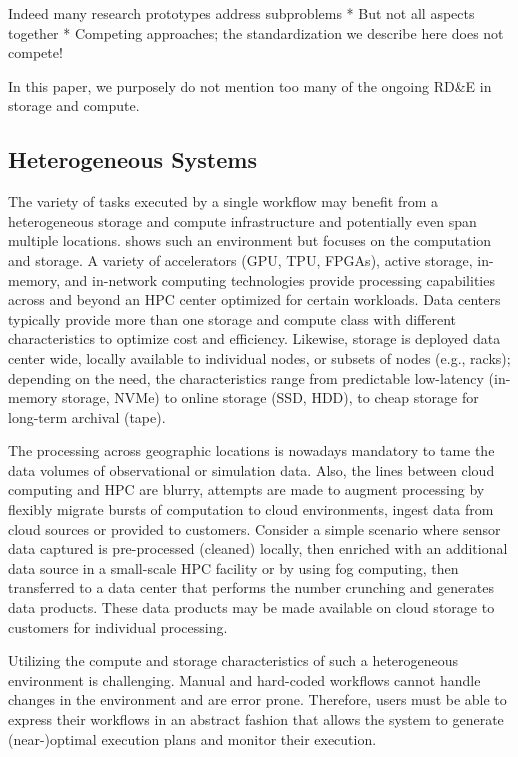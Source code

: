 \documentclass[a4paper, twocolumn]{article}
\begin{document}
Indeed many research prototypes address subproblems
* But not all aspects together
* Competing approaches; the standardization we describe here does not compete!

In this paper, we purposely do not mention too many of the ongoing RD\&E in storage and compute.

\subsection{Heterogeneous Systems}

The variety of tasks executed by a single workflow may benefit from a heterogeneous storage and compute infrastructure and potentially even span multiple locations.
 shows such an environment but focuses on the computation and storage.
A variety of accelerators (GPU, TPU, FPGAs), active storage, in-memory, and in-network computing technologies provide processing capabilities across and beyond an HPC center optimized for certain workloads.
Data centers typically provide more than one storage and compute class with different characteristics to optimize cost and efficiency.
Likewise, storage is deployed data center wide, locally available to individual nodes, or subsets of nodes (e.g., racks); depending on the need, the characteristics range from predictable low-latency (in-memory storage, NVMe) to online storage (SSD, HDD), to cheap storage for long-term archival (tape).

The processing across geographic locations is nowadays mandatory to tame the data volumes of observational or simulation data.
Also, the lines between cloud computing and HPC are blurry, attempts are made to augment processing by flexibly migrate bursts of computation to cloud environments, ingest data from cloud sources or provided to customers.
Consider a simple scenario where sensor data captured is pre-processed (cleaned) locally, then enriched with an additional data source in a small-scale HPC facility or by using fog computing, then transferred to a data center that performs the number crunching and generates data products.
These data products may be made available on cloud storage to customers for individual processing.

Utilizing the compute and storage characteristics of such a heterogeneous environment is challenging.
Manual and hard-coded workflows cannot handle changes in the environment and are error prone.
Therefore, users must be able to express their workflows in an abstract fashion that allows the system to generate (near-)optimal execution plans and monitor their execution.
\end{document}
